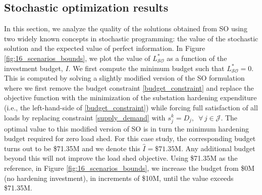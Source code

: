 \documentclass[authoryear,preprint,review,12pt]{elsarticle}\usepackage{amssymb}
\begin{document}
\subsection{Stochastic optimization results}
\label{vssevpi}
In this section, we analyze the quality of the solutions obtained from SO using two widely known concepts in stochastic programming: the value of the stochastic solution and the expected value of perfect information. In Figure \ref{fig:16_scenarios_bounds}, we plot the value of $L_{\mathcal{SO}}^*$ as a function of the investment budget, $I$. We first compute the minimum budget such that $L_{\mathcal{SO}}^* = 0$. This is computed by solving a slightly modified version of the SO formulation where we first remove the budget constraint \eqref{budget_constraint} and replace the objective function with the minimization of the substation hardening expenditure (i.e., the left-hand-side of \eqref{budget_constraint}) while forcing full satisfaction of all loads by replacing constraint \eqref{supply_demand} with $s_{j}^k = D_j, \,\,\, \forall \, j \in \mathcal{J}.$ The optimal value to this modified version of SO is in turn the minimum hardening budget required for zero load shed. For this case study, the corresponding budget turns out to be \$71.35M and we denote this $\hat{I}=\$71.35$M. Any additional budget beyond this will not improve the load shed objective. Using \$71.35M as the reference, in Figure \ref{fig:16_scenarios_bounds}, we increase the budget from \$0M (no hardening investment), in increments of \$10M, until the value exceeds \$71.35M. 
\end{document}
